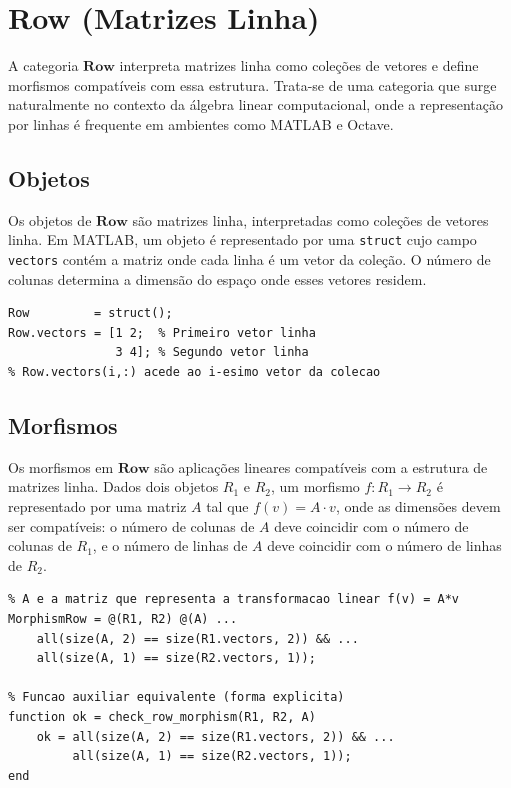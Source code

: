 \section{Row (Matrizes Linha)}
A categoria $\mathbf{Row}$ interpreta matrizes linha como coleções de vetores e define morfismos compatíveis com essa estrutura. Trata-se de uma categoria que surge naturalmente no contexto da álgebra linear computacional, onde a representação por linhas é frequente em ambientes como MATLAB e Octave.

\subsection{Objetos}
Os objetos de $\mathbf{Row}$ são matrizes linha, interpretadas como coleções de vetores linha. Em MATLAB, um objeto é representado por uma \texttt{struct} cujo campo \texttt{vectors} contém a matriz onde cada linha é um vetor da coleção. O número de colunas determina a dimensão do espaço onde esses vetores residem.

\begin{lstlisting}[caption={Representação de uma coleção de vetores linha}]
% Definicao de uma matriz linha (colecao de dois vetores em R^2)
Row         = struct();
Row.vectors = [1 2;  % Primeiro vetor linha
               3 4]; % Segundo vetor linha
% Row.vectors(i,:) acede ao i-esimo vetor da colecao
\end{lstlisting}

\subsection{Morfismos}
Os morfismos em $\mathbf{Row}$ são aplicações lineares compatíveis com a estrutura de matrizes linha. Dados dois objetos $R_1$ e $R_2$, um morfismo $f: R_1 \to R_2$ é representado por uma matriz $A$ tal que $f(v) = A \cdot v$, onde as dimensões devem ser compatíveis: o número de colunas de $A$ deve coincidir com o número de colunas de $R_1$, e o número de linhas de $A$ deve coincidir com o número de linhas de $R_2$.

\begin{lstlisting}[caption={Verificação de morfismo entre matrizes linha}]
% Construtor de verificador de morfismo entre R1 e R2
% A e a matriz que representa a transformacao linear f(v) = A*v
MorphismRow = @(R1, R2) @(A) ...
    all(size(A, 2) == size(R1.vectors, 2)) && ...
    all(size(A, 1) == size(R2.vectors, 1));

% Funcao auxiliar equivalente (forma explicita)
function ok = check_row_morphism(R1, R2, A)
    ok = all(size(A, 2) == size(R1.vectors, 2)) && ...
         all(size(A, 1) == size(R2.vectors, 1));
end
\end{lstlisting}
